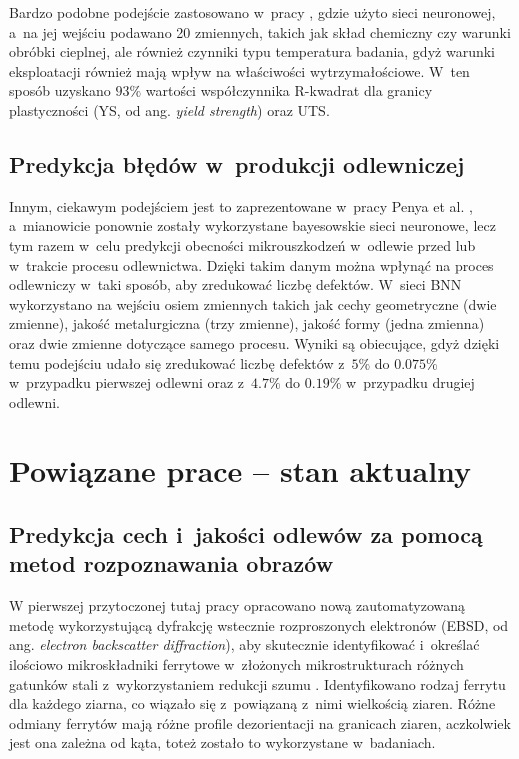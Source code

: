 Bardzo podobne podejście zastosowano w~pracy \cite{Wang20}, gdzie użyto sieci neuronowej, a~na jej wejściu podawano 20 zmiennych, takich jak skład chemiczny czy warunki obróbki cieplnej, ale również czynniki typu temperatura badania, gdyż warunki eksploatacji również mają wpływ na właściwości wytrzymałościowe. W~ten sposób uzyskano $93\%$ wartości współczynnika R-kwadrat dla granicy plastyczności (YS, od ang. \textit{yield strength}) oraz UTS.

\subsection{Predykcja błędów w~produkcji odlewniczej}
\label{sub:predykcja.2}

Innym, ciekawym podejściem jest to zaprezentowane w~pracy Penya et al. \cite{Yoseba08}, a~mianowicie ponownie zostały wykorzystane bayesowskie sieci neuronowe, lecz tym razem w~celu predykcji obecności mikrouszkodzeń w~odlewie przed lub w~trakcie procesu odlewnictwa. Dzięki takim danym można wpłynąć na proces odlewniczy w~taki sposób, aby zredukować liczbę defektów. W~sieci BNN wykorzystano na wejściu osiem zmiennych takich jak cechy geometryczne (dwie zmienne), jakość metalurgiczna (trzy zmienne), jakość formy (jedna zmienna) oraz dwie zmienne dotyczące samego procesu. Wyniki są obiecujące, gdyż dzięki temu podejściu udało się zredukować liczbę defektów z~$5\%$ do $0.075\%$ w~przypadku pierwszej odlewni oraz z~$4.7\%$ do $0.19\%$ w~przypadku drugiej odlewni.

\section{Powiązane prace – stan aktualny}
\label{sec:stan.aktualny}

\subsection{Predykcja cech i~jakości odlewów za pomocą metod rozpoznawania obrazów}
\label{sub:predykcja.3}

W pierwszej przytoczonej tutaj pracy opracowano nową zautomatyzowaną metodę wykorzystującą dyfrakcję wstecznie rozproszonych elektronów (EBSD, od ang. \textit{electron backscatter diffraction}), aby skutecznie identyfikować i~określać ilościowo mikroskładniki ferrytowe w~złożonych mikrostrukturach różnych gatunków stali z~wykorzystaniem redukcji szumu \cite{Shrestha13}. Identyfikowano rodzaj ferrytu dla każdego ziarna, co wiązało się z~powiązaną z~nimi wielkością ziaren. Różne odmiany ferrytów mają różne profile dezorientacji na granicach ziaren, aczkolwiek jest ona zależna od kąta, toteż zostało to wykorzystane w~badaniach.

